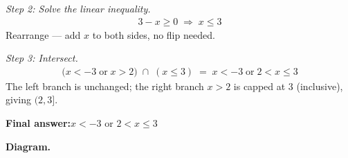 \documentclass[11pt]{article}
\begin{document}
\textit{Step 2: Solve the linear inequality.}
\[\begin{gathered}
3 - x \geq 0 \;\Longrightarrow\; x \leq 3
\end{gathered}\]
Rearrange --- add \( x \) to both sides, no flip needed.

\textit{Step 3: Intersect.}
\[\begin{gathered}
\bigl(x < -3 \;\text{or}\; x > 2\bigr) \;\cap\; (x \leq 3) \;=\; x < -3 \;\text{or}\; 2 < x \leq 3
\end{gathered}\]
The left branch is unchanged; the right branch \( x > 2 \) is capped at 3 (inclusive), giving \( (2, 3] \).

\begin{answerbox}
\textbf{Final answer:}\quad \(\displaystyle x < -3\) or \(\displaystyle 2 < x \leq 3\)
\end{answerbox}
\textbf{Diagram.}
\end{document}
